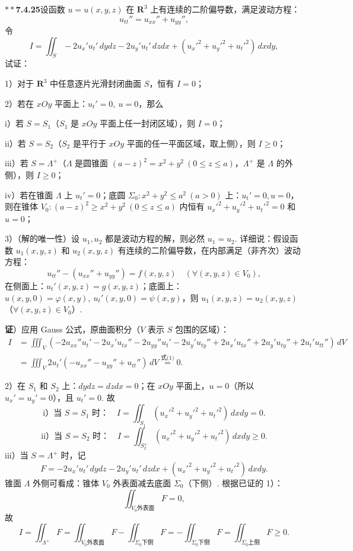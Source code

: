 \documentclass[UTF8, 12pt, fontset=fandol, oneside]{ctexart}
\providecommand{\xlongequal}[1]{\overset{#1}{=}}
\begin{document}
\noindent\textbf{$**$7.4.25}\quad 设函数 $u=u(x,y,z)$ 在 $\mathbf R^3$ 上有连续的二阶偏导数，满足波动方程：
\[
u_{tt}''=u_{xx}''+u_{yy}'', \tag{1}
\]
令
\[
I=\iint_S-2u_x'u_t'\,dydz-2u_y'u_t'\,dzdx+(u_x'^2+u_y'^2+u_t'^2)\,dxdy,
\]
试证：

1）对于 $\mathbf R^3$ 中任意逐片光滑封闭曲面 $S$，恒有 $I=0$；

2）若在 $xOy$ 平面上：$u_t'=0,\ u=0$，那么

i）若 $S=S_1$（$S_1$ 是 $xOy$ 平面上任一封闭区域），则 $I=0$；

ii）若 $S=S_2$（$S_2$ 是平行于 $xOy$ 平面的任一平面区域，取上侧），则 $I\ge0$；

iii）若 $S=\Lambda^+$（$\Lambda$ 是圆锥面 $(a-z)^2=x^2+y^2\ (0\le z\le a)$，$\Lambda^+$ 是 $\Lambda$ 的外侧），则 $I\ge0$；

iv）若在锥面 $\Lambda$ 上 $u_t'=0$；底圆 $\Sigma_0:x^2+y^2\le a^2\ (a>0)$ 上：$u_t'=0,u=0$，则在锥体 $V_0:(a-z)^2\ge x^2+y^2\ (0\le z\le a)$ 内恒有 $u_x'^2+u_y'^2+u_t'^2=0$ 和 $u=0$；

3）（解的唯一性）设 $u_1,u_2$ 都是波动方程的解，则必然 $u_1=u_2$. 详细说：假设函数 $u_1(x,y,z)$ 和 $u_2(x,y,z)$ 有连续的二阶偏导数，在内部满足（非齐次）波动方程：
\[
u_{tt}''-(u_{xx}''+u_{yy}'')=f(x,y,z)\quad(\forall(x,y,z)\in V_0),
\]
在侧面上：$u_t'(x,y,z)=g(x,y,z)$；底面上：$u(x,y,0)=\varphi(x,y),\ u_t'(x,y,0)=\psi(x,y)$，则 $u_1(x,y,z)=u_2(x,y,z)$（$\forall(x,y,z)\in V_0$）.

\noindent\textbf{证}）应用 Gauss 公式，原曲面积分（$V$ 表示 $S$ 包围的区域）：
\[
\begin{aligned}
I&=\iiint_V(-2u_{xx}''u_t'-2u_x'u_{tx}''-2u_{yy}''u_t'-2u_y'u_{ty}''
+2u_x'u_{tx}''+2u_y'u_{ty}''+2u_t'u_{tt}'')\,dV\\
&=\iiint_V2u_t'(-u_{xx}''-u_{yy}''+u_{tt}'')\,dV\xlongequal{\text{式(1)}}0.
\end{aligned}
\]

2）在 $S_1$ 和 $S_2$ 上：$dydz=dzdx=0$；在 $xOy$ 平面上，$u=0$（所以 $u_x'=u_y'=0$），且 $u_t'=0$. 故
\[
\text{i）当 }S=S_1\text{ 时：}\quad I=\iint_{S_1}(u_x'^2+u_y'^2+u_t'^2)\,dxdy=0.
\]
\[
\text{ii）当 }S=S_2\text{ 时：}\quad I=\iint_{S_2^+}(u_x'^2+u_y'^2+u_t'^2)\,dxdy\ge0.
\]
iii）当 $S=\Lambda^+$ 时，记
\[
F=-2u_x'u_t'\,dydz-2u_y'u_t'\,dzdx+(u_x'^2+u_y'^2+u_t'^2)\,dxdy.
\]
锥面 $\Lambda$ 外侧可看成：锥体 $V_0$ 外表面减去底面 $\Sigma_0$（下侧）. 根据已证的 1）：
\[
\iint_{V_0\text{外表面}}F=0,
\]
故
\[
I=\iint_{\Lambda^+}F
=\iint_{V_0\text{外表面}}F-\iint_{\Sigma_0\text{下侧}}F
=-\iint_{\Sigma_0\text{下侧}}F
=\iint_{\Sigma_0\text{上侧}}F\ge0.
\]
\end{document}
